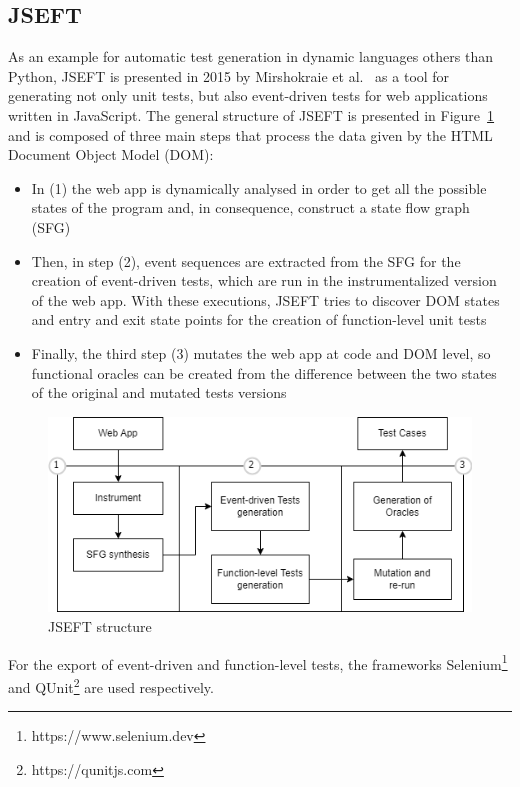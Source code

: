 \documentclass[%
  chapterprefix=false,%
  open=right,%
  twoside=true,%
  paper=a4,%
  logofile={Figures/logo.png},%
  thesistype=master,%
  UKenglish,%
]{se2thesis}
\begin{document}
\subsection*{JSEFT}

As an example for automatic test generation in dynamic languages others than Python, JSEFT is presented in 2015 by Mirshokraie et al.~\cite{DBLP:conf/icst/Mirshokraie0P15} as a tool for generating not only unit tests, but also event-driven tests for web applications written in JavaScript.
The general structure of JSEFT is presented in Figure~\ref{fig:jseft} and is composed of three main steps that process the data given by the HTML Document Object Model (DOM):
\begin{itemize}
  \item In (1) the web app is dynamically analysed in order to get all the possible states of the program and, in consequence, construct a state flow graph (SFG)
  \item Then, in step (2), event sequences are extracted from the SFG for the creation of event-driven tests, which are run in the instrumentalized version of the web app.
  With these executions, JSEFT tries to discover DOM states and entry and exit state points for the creation of function-level unit tests
  \item Finally, the third step (3) mutates the web app at code and DOM level, so functional oracles can be created from the difference between the two states of the original and mutated tests versions
\end{itemize}

\begin{figure}[tb]
  \centering 
  \includegraphics[width=.99\textwidth]{Figures/jseft2.png}
  \caption{JSEFT structure}\label{fig:jseft}
\end{figure}

For the export of event-driven and function-level tests, the frameworks Selenium\footnote{https://www.selenium.dev} and QUnit\footnote{https://qunitjs.com} are used respectively.
\end{document}
